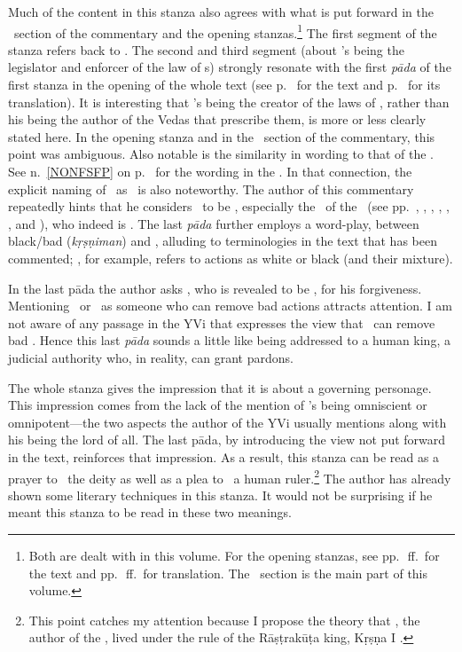 Much of the content in this stanza also agrees with what is put forward in the \Isvara\ section of the commentary and the opening stanzas.\footnote{Both are dealt with in this volume. For the opening stanzas, see pp.~\pageref{edition01}\,ff.\ for the text and pp.~\pageref{OSTZ1}\,ff.\ for translation. The \Isvara\ section is the main part of this volume.} The first segment of the stanza refers back to . The second and third segment (about \Isvara's being the legislator and enforcer of the law of \karman s) strongly resonate with the first \emph{pāda} of the first stanza in the opening of the whole text (see p.~\pageref{FVFPEDN} for the text and p.~\pageref{FVFPTRL} for its translation). It is interesting that \Isvara's being the creator of the laws of \karman, rather than his being the author of the Vedas that prescribe them, is more or less clearly stated here. In the opening stanza and in the \Isvara\ section of the commentary, this point was ambiguous. Also notable is the similarity in wording to that of the \BhGBh. See n.~\ref{NONFSFP} on p.~\pageref{NONFSFP} for the wording in the \BhGBh. In that connection, the explicit naming of \Isvara\ as \Krsna\ is also noteworthy. The author of this commentary repeatedly hints that he considers \Isvara\ to be \Visnu, especially the \Bhagavat\ of the \BhG\ (see pp.~\pageref{narayana}, \pageref{gita1155}, \pageref{omvisnu}, \pageref{NRYNN25}, \pageref{NNRYN26}, \pageref{VISNU27}, and \pageref{VSNSM1}), who indeed is \Krsna. The last \emph{pāda} further employs a word-play, between black/bad (\emph{kṛṣṇiman}) and \Krsna, alluding to terminologies in the text that has been commented; , for example, refers to actions as white or black (and their mixture).

In the last pāda the author asks \Isvara, who is revealed to be \Krsna, for his forgiveness. Mentioning \Isvara\ or \Krsna\ as someone who can remove bad actions attracts attention. I am not aware of any passage in the YVi that expresses the view that \Isvara\ can remove bad \karman. Hence this last \emph{pāda} sounds a little like being addressed to a human king, a judicial authority who, in reality, can grant pardons. %

The whole stanza gives the impression that it is about a governing personage. This impression comes from the lack of the mention of \Isvara's being omniscient or omnipotent---the two aspects the author of the YVi usually mentions along with his being the lord of all. The last pāda, by introducing the view not put forward in the text, reinforces that impression. As a result, this stanza can be read as a prayer to \Krsna\ the deity as well as a plea to \Krsna\ a human ruler.\footnote{This point catches my attention because I propose the theory that \Sankara, the author of the \BSBh, lived under the rule of the Rāṣṭrakūṭa king, Kṛṣṇa I \citep{harimoto:2006}.} The author has already shown some literary techniques in this stanza. It would not be surprising if he meant this stanza to be read in these two meanings.

